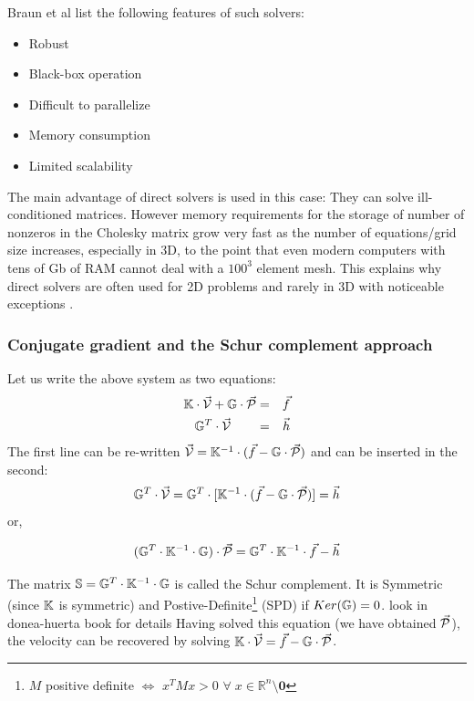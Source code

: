 Braun et al \cite{brtf08} list the following features of such solvers:
\begin{itemize}
\item Robust
\item Black-box operation
\item Difficult to parallelize
\item Memory consumption
\item Limited scalability
\end{itemize}

The main advantage of direct solvers is used in this case: They can solve ill-conditioned 
matrices. However memory requirements for the storage of number of nonzeros in the 
Cholesky matrix grow very fast as the number of equations/grid size increases, especially in 3D,
to the point that even modern computers with tens of Gb of RAM cannot deal with a $100^3$ element mesh.
This explains why direct solvers are often used for 2D problems and rarely in 3D with noticeable 
exceptions \cite{thfb08,yahb09,brya09,lobh10,alht11,alht12,alhf13,whbb14,neew18}. 


\subsubsection{Conjugate gradient and the Schur complement approach }






Let us write the above system as two equations:
\begin{eqnarray}
{\mathbb{K}} \cdot \vec{\cal V} + {\mathbb{G}} \cdot \vec{\cal P} &=& \vec{f} \\
{\mathbb{G}}^T \cdot  \vec{\cal V} \quad\quad &=& \vec{h} 
\end{eqnarray}
The first line can be re-written $\vec{\cal V}={\mathbb{K}}^{-1}\cdot (\vec{f} - {\mathbb{G}} \cdot \vec{\cal P})$ and can be inserted in the second:
\[
{\mathbb{G}}^T\cdot \vec{\cal V} ={\mathbb{G}}^T \cdot  [ {\mathbb{K}}^{-1} \cdot  (\vec{f} - {\mathbb{G}} \cdot  \vec{\cal P}) ] = \vec{h} 
\]
or, 
\begin{mdframed}[backgroundcolor=blue!5]
\[
({\mathbb{G}}^T \cdot {\mathbb{K}}^{-1} \cdot {\mathbb{G}}) \cdot \vec{\cal P} = {\mathbb{G}}^T \cdot {\mathbb{K}}^{-1}\cdot \vec{f} - \vec{h} 
\]
\end{mdframed}
The matrix ${\mathbb{S}}= {\mathbb{G}}^T \cdot {\mathbb{K}}^{-1} \cdot {\mathbb{G}} $ is called the Schur complement.  
It is Symmetric (since ${\mathbb{K}}$ is symmetric) and  Postive-Definite\footnote{$M$ 
positive definite $\iff$ $x^TMx>0$ $\forall \; x\in \mathbb{R}^n \setminus {\bm 0}$ }
(SPD)  if $Ker({{\mathbb{G}}})=0$. 
{\color{red} look in donea-huerta book for details}
Having solved this equation (we have obtained $\vec{\cal P}$), the velocity can be recovered by solving 
${\mathbb{K}}\cdot \vec{\cal V} =\vec{f}- {\mathbb{G}} \cdot \vec{\cal P}$. 


